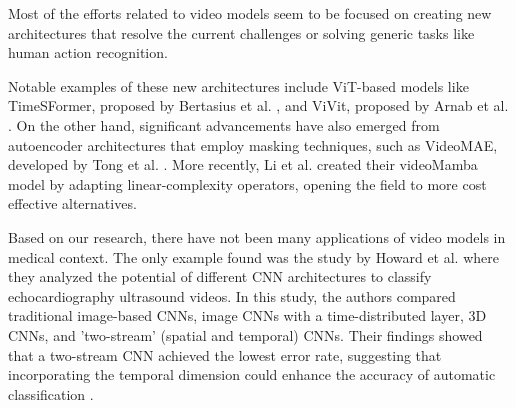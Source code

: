 Most of the efforts related to video models seem to be focused on creating new architectures that resolve the current challenges or solving generic tasks like human action recognition.

Notable examples of these new architectures include ViT-based models like TimeSFormer, proposed by Bertasius et al. \cite{DBLP:journals/corr/abs-2102-05095}, and ViVit, proposed by Arnab et al. \cite{DBLP:journals/corr/abs-2103-15691}. On the other hand, significant advancements have also emerged from autoencoder architectures that employ masking techniques, such as VideoMAE, developed by Tong et al. \cite{VideoMAE}. More recently, Li et al. \cite{li2024videomambastatespacemodel} created their videoMamba model by adapting linear-complexity operators, opening the field to more cost effective alternatives.

Based on our research, there have not been many applications of video models in medical context. The only example found was the study by Howard et al. \cite{JMAI5205} where they analyzed the potential of different CNN architectures to classify echocardiography ultrasound videos. In this study, the authors compared traditional image-based CNNs, image CNNs with a time-distributed layer, 3D CNNs, and 'two-stream' (spatial and temporal) CNNs. Their findings showed that a two-stream CNN achieved the lowest error rate, suggesting that incorporating the temporal dimension could enhance the accuracy of automatic classification \cite{JMAI5205}.